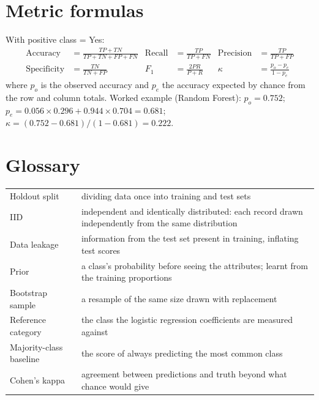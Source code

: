 \documentclass[11pt,a4paper]{article}
\begin{document}
\appendix
\section{Metric formulas}
With positive class = Yes:
\begin{align*}
\text{Accuracy} &= \tfrac{TP+TN}{TP+TN+FP+FN} &
\text{Recall} &= \tfrac{TP}{TP+FN} &
\text{Precision} &= \tfrac{TP}{TP+FP} \\
\text{Specificity} &= \tfrac{TN}{TN+FP} &
F_1 &= \tfrac{2PR}{P+R} &
\kappa &= \tfrac{p_o-p_e}{1-p_e}
\end{align*}
where $p_o$ is the observed accuracy and $p_e$ the accuracy expected by chance from the row and column totals.
Worked example (Random Forest): $p_o = 0.752$; $p_e = 0.056 \times 0.296 + 0.944 \times 0.704 = 0.681$;
$\kappa = (0.752 - 0.681)/(1 - 0.681) = 0.222$.

\section{Glossary}
\begin{tabularx}{\linewidth}{@{}p{3.6cm}L@{}}
\toprule
Holdout split & dividing data once into training and test sets \\
IID & independent and identically distributed: each record drawn independently from the same distribution \\
Data leakage & information from the test set present in training, inflating test scores \\
Prior & a class's probability before seeing the attributes; learnt from the training proportions \\
Bootstrap sample & a resample of the same size drawn with replacement \\
Reference category & the class the logistic regression coefficients are measured against \\
Majority-class baseline & the score of always predicting the most common class \\
Cohen's kappa & agreement between predictions and truth beyond what chance would give \\ \bottomrule
\end{tabularx}
\end{document}
